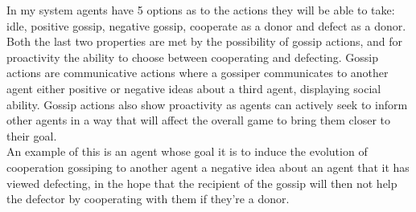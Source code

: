 \documentclass[twoside,twocolumn]{article}
\begin{document}
In my system agents have 5 options as to the actions they will be able to take: idle, positive gossip, negative gossip, cooperate as a donor and defect as a donor. Both the last two properties are met by the possibility of gossip actions, and for proactivity the ability to choose between cooperating and defecting. Gossip actions are communicative actions where a gossiper communicates to another agent either positive or negative ideas about a third agent, displaying social ability. Gossip actions also show proactivity as agents can actively seek to inform other agents in a way that will affect the overall game to bring them closer to their goal.\\
An example of this is an agent whose goal it is to induce the evolution of cooperation gossiping to another agent a negative idea about an agent that it has viewed defecting, in the hope that the recipient of the gossip will then not help the defector by cooperating with them if they're a donor.
\end{document}
